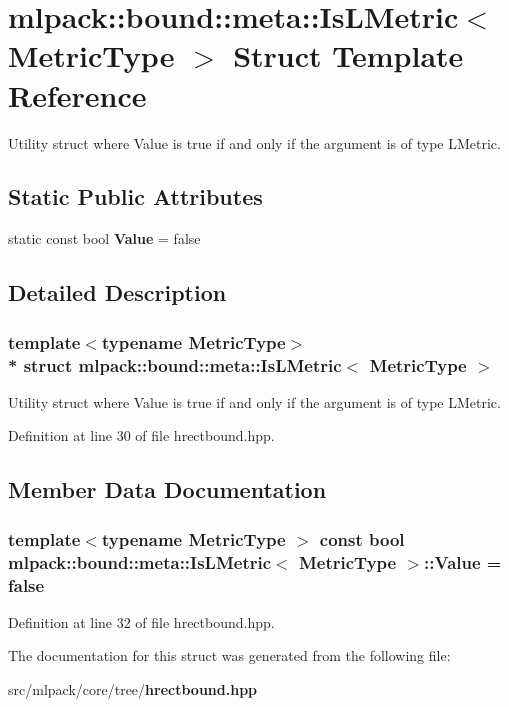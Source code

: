 \section{mlpack\+:\+:bound\+:\+:meta\+:\+:Is\+L\+Metric$<$ Metric\+Type $>$ Struct Template Reference}
\label{structmlpack_1_1bound_1_1meta_1_1IsLMetric}


Utility struct where Value is true if and only if the argument is of type L\+Metric.  


\subsection*{Static Public Attributes}
\begin{DoxyCompactItemize}
\item 
static const bool {\bf Value} = false
\end{DoxyCompactItemize}


\subsection{Detailed Description}
\subsubsection*{template$<$typename Metric\+Type$>$\\*
struct mlpack\+::bound\+::meta\+::\+Is\+L\+Metric$<$ Metric\+Type $>$}

Utility struct where Value is true if and only if the argument is of type L\+Metric. 



Definition at line 30 of file hrectbound.\+hpp.



\subsection{Member Data Documentation}
\subsubsection[{Value}]{\setlength{\rightskip}{0pt plus 5cm}template$<$typename Metric\+Type $>$ const bool {\bf mlpack\+::bound\+::meta\+::\+Is\+L\+Metric}$<$ Metric\+Type $>$\+::Value = false\hspace{0.3cm}{\ttfamily [static]}}\label{structmlpack_1_1bound_1_1meta_1_1IsLMetric_ac13143da05aca33156fd1361e4ad4d8d}


Definition at line 32 of file hrectbound.\+hpp.



The documentation for this struct was generated from the following file\+:\begin{DoxyCompactItemize}
\item 
src/mlpack/core/tree/{\bf hrectbound.\+hpp}\end{DoxyCompactItemize}
